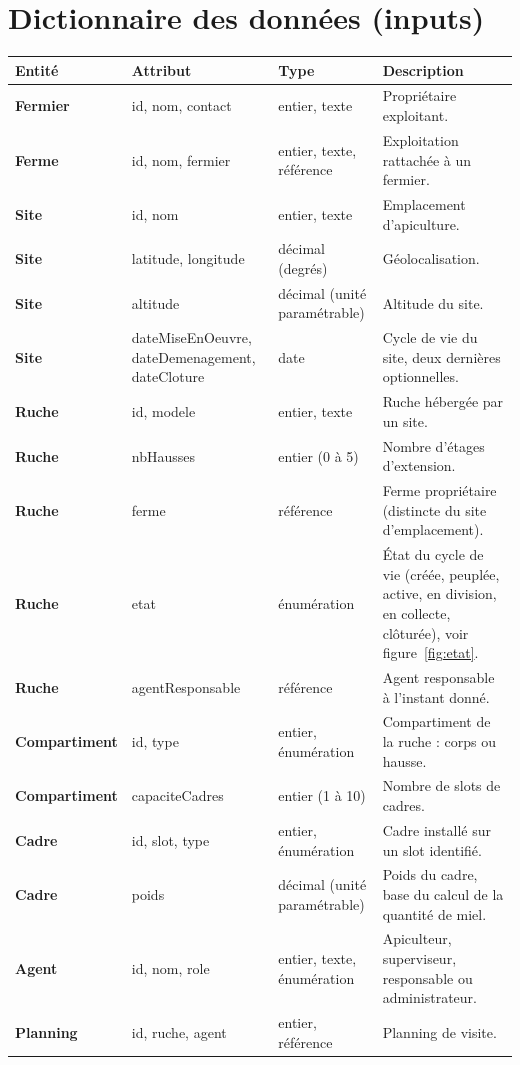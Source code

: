 \section{Dictionnaire des données (inputs)}
\begin{xltabular}{\textwidth}{>{\bfseries}p{2.6cm} p{3.4cm} p{2.4cm} X}
\toprule
\textbf{Entité} & \textbf{Attribut} & \textbf{Type} & \textbf{Description} \\
\midrule
\endhead
Fermier & id, nom, contact & entier, texte & Propriétaire exploitant. \\
Ferme & id, nom, fermier & entier, texte, référence & Exploitation rattachée à un fermier. \\
Site & id, nom & entier, texte & Emplacement d'apiculture. \\
Site & latitude, longitude & décimal (degrés) & Géolocalisation. \\
Site & altitude & décimal (unité paramétrable) & Altitude du site. \\
Site & dateMiseEnOeuvre, dateDemenagement, dateCloture & date & Cycle de vie du site, deux dernières optionnelles. \\
Ruche & id, modele & entier, texte & Ruche hébergée par un site. \\
Ruche & nbHausses & entier (0 à 5) & Nombre d'étages d'extension. \\
Ruche & ferme & référence & Ferme propriétaire (distincte du site d'emplacement). \\
Ruche & etat & énumération & État du cycle de vie (créée, peuplée, active, en division, en collecte, clôturée), voir figure~\ref{fig:etat}. \\
Ruche & agentResponsable & référence & Agent responsable à l'instant donné. \\
Compartiment & id, type & entier, énumération & Compartiment de la ruche : corps ou hausse. \\
Compartiment & capaciteCadres & entier (1 à 10) & Nombre de slots de cadres. \\
Cadre & id, slot, type & entier, énumération & Cadre installé sur un slot identifié. \\
Cadre & poids & décimal (unité paramétrable) & Poids du cadre, base du calcul de la quantité de miel. \\
Agent & id, nom, role & entier, texte, énumération & Apiculteur, superviseur, responsable ou administrateur. \\
Planning & id, ruche, agent & entier, référence & Planning de visite. \\

\end{xltabular}
